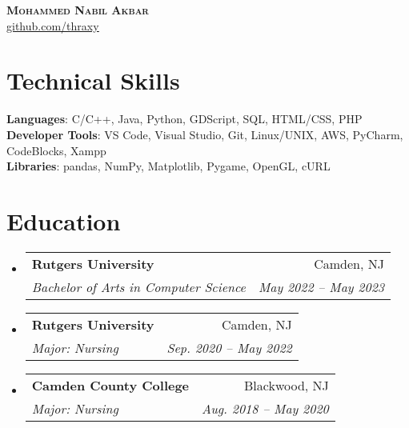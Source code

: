 \documentclass[letterpaper,11pt]{article}
\makeatletter
\newcommand{\resumeSubheading}[4]{
  \vspace{-2pt}\item
    \begin{tabular*}{0.97\textwidth}[t]{l@{\extracolsep{\fill}}r}
      \textbf{#1} & #2 \\
      \textit{\small#3} & \textit{\small #4} \\
    \end{tabular*}\vspace{-7pt}
}
\newcommand{\resumeSubHeadingListStart}{\begin{itemize}[leftmargin=0.15in, label={}]}
\newcommand{\resumeSubHeadingListEnd}{\end{itemize}}
\makeatother
\begin{document}

\begin{center}
    \textbf{\Huge \scshape Mohammed Nabil Akbar} \\ \vspace{1pt}
    \href{https://github.com/thraxy}{\underline{github.com/thraxy}}
\end{center}

\section{Technical Skills}
 \begin{itemize}[leftmargin=0.15in, label={}]
    \small{\item{
     \textbf{Languages}{: C/C++, Java, Python, GDScript, SQL, HTML/CSS, PHP} \\
     \textbf{Developer Tools}{: VS Code, Visual Studio, Git, Linux/UNIX, AWS, PyCharm, CodeBlocks, Xampp } \\
     \textbf{Libraries}{: pandas, NumPy, Matplotlib, Pygame, OpenGL, cURL}
    }}
 \end{itemize}
\section{Education}
  \resumeSubHeadingListStart
    \resumeSubheading
      {Rutgers University}{Camden, NJ}
      {Bachelor of Arts in Computer Science}{May 2022 -- May 2023}
      \resumeSubheading
      {Rutgers University}{Camden, NJ}
      {Major: Nursing}{Sep. 2020 -- May 2022}
    \resumeSubheading
      {Camden County College}{Blackwood, NJ}
      {Major: Nursing}{Aug. 2018 -- May 2020}
  \resumeSubHeadingListEnd

\end{document}
